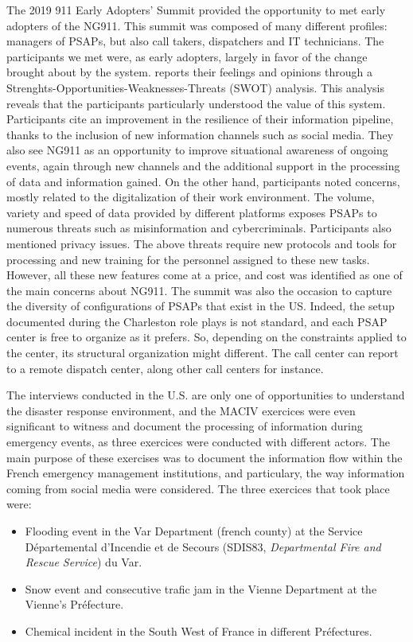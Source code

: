 The 2019 911 Early Adopters’ Summit provided the opportunity to met early adopters of the NG911.
This summit was composed of many different profiles: managers of PSAPs, but also call takers, dispatchers and IT technicians.
The participants we met were, as early adopters, largely in favor of the change brought about by the system.
\textcite{graceCommunicatingNextGeneration9112020} reports their feelings and opinions through a Strenghts-Opportunities-Weaknesses-Threats (SWOT) analysis.
This analysis reveals that the participants particularly understood the value of this system.
Participants cite an improvement in the resilience of their information pipeline, thanks to the inclusion of new information channels such as social media.
They also see NG911 as an opportunity to improve situational awareness of ongoing events, again through new channels and
the additional support in the processing of data and information gained.
On the other hand, participants noted concerns, mostly related to the digitalization of their work environment.
The volume, variety and speed of data provided by different platforms exposes PSAPs to numerous threats such as misinformation and cybercriminals.
Participants also mentioned privacy issues.
The above threats require new protocols and tools for processing and new training for the personnel assigned to these new tasks.
However, all these new features come at a price, and cost was identified as one of the main concerns about NG911.
The summit was also the occasion to capture the diversity of configurations of PSAPs that exist in the US.
Indeed, the setup documented during the Charleston role plays is not standard, and each PSAP center is free to organize as it prefers.
So, depending on the constraints applied to the center, its structural organization might different.
The call center can report to a remote dispatch center, along other call centers for instance.

The interviews conducted in the U.S. are only one of opportunities to understand the disaster response environment, and the MACIV exercices were even significant to witness and document the
processing of information during emergency events, as three exercices were conducted with different actors.
The main purpose of these exercises was to document the information flow within the French emergency management institutions, and particulary, the way information coming from social media were considered.
The three exercices that took place were:

\begin{itemize}
    \item Flooding event in the Var Department (french county) at the Service Départemental d’Incendie et de Secours (SDIS83, \textit{Departmental Fire and Rescue Service}) du Var.
    \item Snow event and consecutive trafic jam in the Vienne Department at the Vienne's Préfecture.
    \item Chemical incident in the South West of France in different Préfectures.
\end{itemize}


